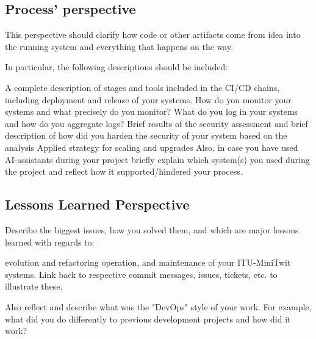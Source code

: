 \documentclass{article}
\begin{document}
\subsection{Process' perspective}

This perspective should clarify how code or other artifacts come from idea into the running system and everything that happens on the way.

In particular, the following descriptions should be included:

A complete description of stages and tools included in the CI/CD chains, including deployment and release of your systems.
How do you monitor your systems and what precisely do you monitor?
What do you log in your systems and how do you aggregate logs?
Brief results of the security assessment and brief description of how did you harden the security of your system based on the analysis
Applied strategy for scaling and upgrades
Also, in case you have used AI-assistants during your project briefly explain which system(s) you used during the project and reflect how it supported/hindered your process.

\subsection{Lessons Learned Perspective}

Describe the biggest issues, how you solved them, and which are major lessons learned with regards to:

evolution and refactoring
operation, and
maintenance
of your ITU-MiniTwit systems. Link back to respective commit messages, issues, tickets, etc. to illustrate these.

Also reflect and describe what was the "DevOps" style of your work. For example, what did you do differently to previous development projects and how did it work?
\end{document}
